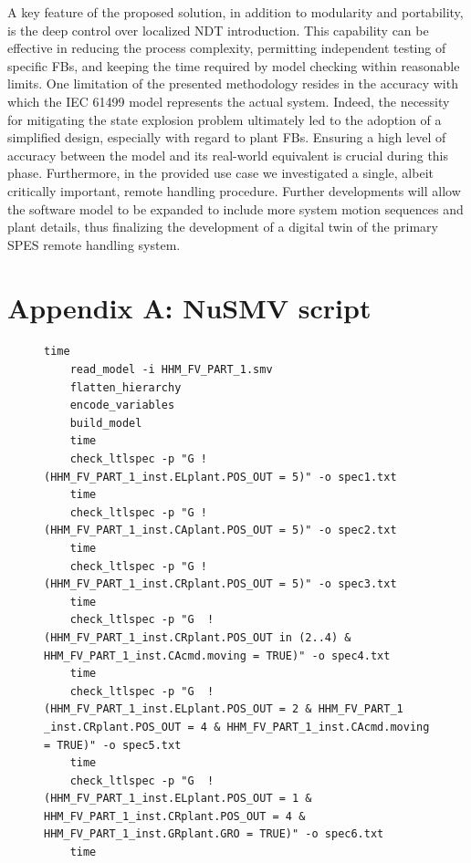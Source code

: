 \begin{bibunit}
A key feature of the proposed solution, in addition to modularity and portability, is the deep control over localized NDT introduction. This capability can be effective in reducing the process complexity, permitting independent testing of specific FBs, and keeping the time required by model checking within reasonable limits. 
One limitation of the presented methodology resides in the accuracy with which the IEC 61499 model represents the actual system. Indeed, the necessity for mitigating the state explosion problem ultimately led to the adoption of a simplified design, especially with regard to plant FBs. 
Ensuring a high level of accuracy between the model and its real-world equivalent is crucial during this phase. Furthermore, in the provided use case we investigated a single, albeit critically important, remote handling procedure. 
Further developments will allow the software model to be expanded to include more system motion sequences and plant details, thus finalizing the development of a digital twin of the primary SPES remote handling system.


\section*{Appendix A: NuSMV script}
\label{appA:NuSMV script}
\begin{figure}[h!]
    \centering
    \begin{lstlisting}[caption=Batch script used to check the LTL specifications with NuSMV.]
    time
    read_model -i HHM_FV_PART_1.smv
    flatten_hierarchy
    encode_variables
    build_model
    time
    check_ltlspec -p "G !(HHM_FV_PART_1_inst.ELplant.POS_OUT = 5)" -o spec1.txt
    time
    check_ltlspec -p "G !(HHM_FV_PART_1_inst.CAplant.POS_OUT = 5)" -o spec2.txt
    time
    check_ltlspec -p "G !(HHM_FV_PART_1_inst.CRplant.POS_OUT = 5)" -o spec3.txt
    time
    check_ltlspec -p "G  !(HHM_FV_PART_1_inst.CRplant.POS_OUT in (2..4) & HHM_FV_PART_1_inst.CAcmd.moving = TRUE)" -o spec4.txt
    time
    check_ltlspec -p "G  !(HHM_FV_PART_1_inst.ELplant.POS_OUT = 2 & HHM_FV_PART_1 _inst.CRplant.POS_OUT = 4 & HHM_FV_PART_1_inst.CAcmd.moving = TRUE)" -o spec5.txt
    time
    check_ltlspec -p "G  !(HHM_FV_PART_1_inst.ELplant.POS_OUT = 1 & HHM_FV_PART_1_inst.CRplant.POS_OUT = 4 & HHM_FV_PART_1_inst.GRplant.GRO = TRUE)" -o spec6.txt
    time
    \end{lstlisting}
    \label{lst:ltl specs}
\end{figure}

\clearpage
\putbib
\end{bibunit}
